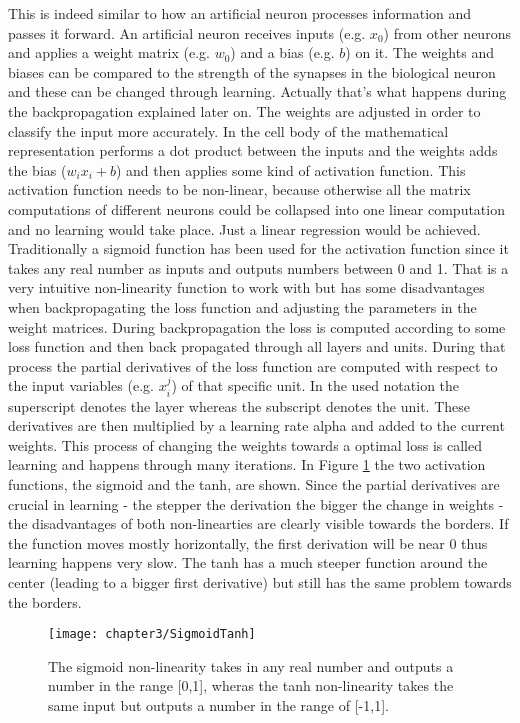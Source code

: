This is indeed similar to how an artificial neuron processes information and passes it forward. An artificial neuron receives inputs (e.g. $x_0$) from other neurons and applies a weight matrix (e.g. $w_0$) and a bias (e.g. $b$) on it. The weights and biases can be compared to the strength of the synapses in the biological neuron and these can be changed through learning. Actually that's what happens during the backpropagation explained later on. The weights are adjusted in order to classify the input more accurately. In the cell body of the mathematical representation performs a dot product between the inputs and the weights adds the bias ($w_i x_i + b$) and then applies some kind of activation function. This activation function needs to be non-linear, because otherwise all the matrix computations of different neurons could be collapsed into one linear computation and no learning would take place. Just a linear regression would be achieved.
Traditionally a sigmoid function has been used for the activation function since it takes any real number as inputs and outputs numbers between 0 and 1. That is a very intuitive non-linearity function to work with but has some disadvantages when backpropagating the loss function and adjusting the parameters in the weight matrices.  During backpropagation the loss is computed according to some loss function and then back propagated through all layers and units. During that process the partial derivatives of the loss function are computed with respect to the input variables (e.g. $x_i^j$) of that specific unit. In the used notation the superscript denotes the layer whereas the subscript denotes the unit. These derivatives are then multiplied by a learning rate alpha and added to the current weights. This process of changing the weights towards a optimal loss is called learning and happens through many iterations. In Figure \ref{fig:SigmoidTanh} the two activation functions, the sigmoid and the tanh, are shown. Since the partial derivatives are crucial in learning - the stepper the derivation the bigger the change in weights - the disadvantages of both non-linearties are clearly visible towards the borders. If the function moves mostly horizontally, the first derivation will be near 0 thus learning happens very slow. The tanh has a much steeper function around the center (leading to a bigger first derivative) but still has the same problem towards the borders.

\begin{figure}[H]
  \centering
  \caption{The sigmoid non-linearity takes in any real number and outputs a number in the range [0,1], wheras the tanh non-linearity takes the same input but outputs a number in the range of [-1,1]. \cite{cs231neuralnetworks}}
  \texttt{[image: chapter3/SigmoidTanh]}
  \label{fig:SigmoidTanh}
\end{figure}


